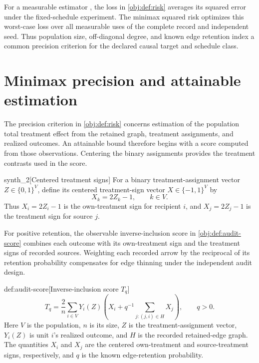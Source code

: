 \documentclass[11pt]{article}
\begin{document}
For a measurable estimator , the loss  in \cref{obj:def:risk} averages its squared error under the fixed-schedule experiment. The minimax squared risk  optimizes this worst-case loss over all measurable uses of the complete record and independent seed. Thus population size, off-diagonal degree, and known edge retention index a common precision criterion for the declared causal target and schedule class.


\section{Minimax precision and attainable estimation}

The precision criterion in \cref{obj:def:risk} concerns estimation of the population total treatment effect from the retained graph, treatment assignments, and realized outcomes. An attainable bound therefore begins with a score computed from those observations. Centering the binary assignments provides the treatment contrasts used in the score.

\begin{definitionv}{synth_2}[Centered treatment signs]
For a binary treatment-assignment vector \(Z\in\{0,1\}^V\), define its centered treatment-sign vector \(X\in\{-1,1\}^V\) by
\[
X_k=2Z_k-1,\qquad k\in V.
\]
Thus \(X_i=2Z_i-1\) is the own-treatment sign for recipient \(i\), and \(X_j=2Z_j-1\) is the treatment sign for source \(j\).
\end{definitionv}

For positive retention, the observable inverse-inclusion score  in \cref{obj:def:audit-score} combines each outcome with its own-treatment sign and the treatment signs of recorded sources. Weighting each recorded arrow by the reciprocal of its retention probability compensates for edge thinning under the independent audit design.

\begin{definitionv}{def:audit-score}[Inverse-inclusion score $T_q$]
\[
T_q
=
\frac2n\sum_{i\in V}Y_i(Z)
\left(X_i+q^{-1}\sum_{j:(j,i)\in H}X_j\right),
\qquad q>0.
\]
Here \(V\) is the population, \(n\) is its size, \(Z\) is the treatment-assignment vector, \(Y_i(Z)\) is unit \(i\)'s realized outcome, and \(H\) is the recorded retained-edge graph. The quantities \(X_i\) and \(X_j\) are the centered own-treatment and source-treatment signs, respectively, and \(q\) is the known edge-retention probability.
\end{definitionv}
\end{document}
